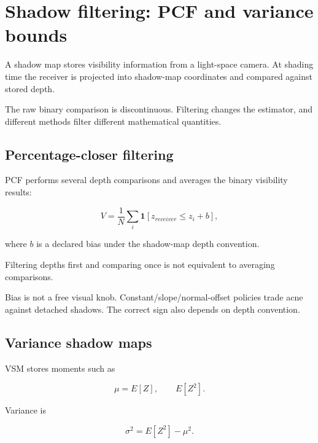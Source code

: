 \hypertarget{appendix-7cac8a689849}{}\label{referencestart:appendix-7cac8a689849}
\section{Shadow filtering: PCF and variance bounds}\label{appendix-7cac8a689849-shadow-filtering-pcf-and-variance-bounds}

\hypertarget{appendix-7cac8a689849-shadow-filtering-pcf-and-variance-bounds}{}

A shadow map stores visibility information from a light-space camera. At shading time the receiver is projected into shadow-map coordinates and compared against stored depth.

The raw binary comparison is discontinuous. Filtering changes the estimator, and different methods filter different mathematical quantities.

\subsection{Percentage-closer filtering}\label{appendix-7cac8a689849-percentage-closer-filtering}

\hypertarget{appendix-7cac8a689849-percentage-closer-filtering}{}

PCF performs several depth comparisons and averages the binary visibility results:

\[
V=
\frac{1}{N}
\sum_i
\mathbf 1[z_{receiver}\le z_i+b],
\]

where \(b\) is a declared bias under the shadow-map depth convention.

Filtering depths first and comparing once is not equivalent to averaging comparisons.

Bias is not a free visual knob. Constant/slope/normal-offset policies trade acne against detached shadows. The correct sign also depends on depth convention.

\subsection{Variance shadow maps}\label{appendix-7cac8a689849-variance-shadow-maps}

\hypertarget{appendix-7cac8a689849-variance-shadow-maps}{}

VSM stores moments such as

\[
\mu=E[Z],
\qquad
E[Z^2].
\]

Variance is

\[
\sigma^2=E[Z^2]-\mu^2.
\]

